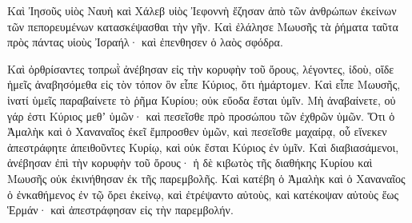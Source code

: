 {Καὶ Ἰησοῦς υἱὸς Ναυὴ καὶ Χάλεβ υἱὸς Ἰεφοννὴ ἔζησαν ἀπὸ τῶν ἀνθρώπων ἐκείνων τῶν πεπορευμένων κατασκέψασθαι τὴν γῆν.
Καὶ ἐλάλησε Μωυσῆς τὰ ῥήματα ταῦτα πρὸς πάντας υἱοὺς Ἰσραήλ· καὶ ἐπενθησεν ὁ λαὸς σφόδρα.
\par }{\PP {}Καὶ ὀρθρίσαντες τοπρωῒ ἀνέβησαν εἰς τὴν κορυφὴν τοῦ ὄρους, λέγοντες, ἰδοὺ, οἵδε ἡμεῖς ἀναβησόμεθα εἰς τὸν τόπον ὃν εἶπε Κύριος, ὅτι ἡμάρτομεν.
Καὶ εἶπε Μωυσῆς, ἱνατί ὑμεῖς παραβαίνετε τὸ ῥῆμα Κυρίου; οὐκ εὔοδα ἔσται ὑμῖν.
Μὴ ἀναβαίνετε, οὐ γάρ ἐστι Κύριος μεθʼ ὑμῶν· καὶ πεσεῖσθε πρὸ προσώπου τῶν ἐχθρῶν ὑμῶν.
Ὅτι ὁ Ἀμαλὴκ καὶ ὁ Χαναναῖος ἐκεῖ ἔμπροσθεν ὑμῶν, καὶ πεσεῖσθε μαχαίρᾳ, οὗ εἵνεκεν ἀπεστράφητε ἀπειθοῦντες Κυρίῳ, καὶ οὐκ ἔσται Κύριος ἐν ὑμῖν.
Καὶ διαβιασάμενοι, ἀνέβησαν ἐπὶ τὴν κορυφὴν τοῦ ὄρους· ἡ δὲ κιβωτὸς τῆς διαθήκης Κυρίου καὶ Μωυσῆς οὐκ ἐκινήθησαν ἐκ τῆς παρεμβολῆς.
Καὶ κατέβη ὁ Ἀμαλὴκ καὶ ὁ Χαναναῖος ὁ ἐνκαθήμενος ἐν τῷ ὄρει ἐκείνῳ, καὶ ἐτρέψαντο αὐτοὺς, καὶ κατέκοψαν αὐτοὺς ἕως Ἑρμάν· καὶ ἀπεστράφησαν εἰς τὴν παρεμβολήν.

}
